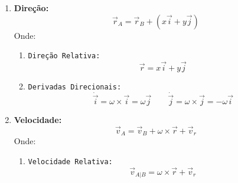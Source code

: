 \documentclass{article}
\begin{document}
                \begin{enumerate}[rightmargin = \leftmargin, noitemsep]
                    \item \textbf{Direção:}
                        \begin{equation}
                            \boxed{
                                \vec{r}_{A} = \vec{r}_{B} + (x\vec{i} + y\vec{j})
                            }
                        \end{equation}
                    Onde:
                        \begin{enumerate}[rightmargin = \leftmargin]
                            \item \texttt{Direção Relativa:}
                                \begin{equation}
                                    \boxed{
                                        \vec{r} = x\vec{i} + y\vec{j}
                                    }
                                \end{equation}

                            \item \texttt{Derivadas Direcionais:}
                                \begin{equation}
                                    \boxed{
                                        \dot{\vec{i}} = \omega\times\vec{i} = \omega\vec{j}
                                    }
                                    \qquad
                                    \boxed{
                                        \dot{\vec{j}} = \omega\times\vec{j} = -\omega\vec{i}
                                    }
                                \end{equation}
                        \end{enumerate}

                    \item \textbf{Velocidade:}
                        \begin{equation}
                            \boxed{
                                \vec{v}_{A} = \vec{v}_{B} + \omega\times\vec{r} + \vec{v}_{r}
                            }
                        \end{equation}
                    Onde:
                        \begin{enumerate}[rightmargin = \leftmargin, noitemsep]
                            \item \texttt{Velocidade Relativa:}
                                \begin{equation}
                                    \boxed{
                                        \vec{v}_{A|B} = \omega\times\vec{r} + \vec{v}_{r}
                                    }
                                \end{equation}
                        \end{enumerate}


\end{enumerate}
\end{document}
